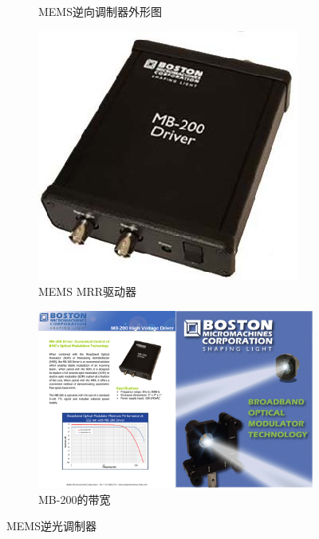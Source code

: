 \begin{figure}[t]
\begin{subfigure}[c]{0.3\textwidth}
		\caption{MEMS逆向调制器外形图}
		\label{fig:boston-MEMS-MRR-outer.jpg}
	\end{subfigure}
	\begin{subfigure}[c]{0.3\textwidth}
		\includegraphics[width=\textwidth]{./Img/boston-MEMS-MRR-driver.jpg}
		\caption{MEMS MRR驱动器}
		\label{fig:boston-MEMS-MRR-driver.jpg}
	\end{subfigure}
	\begin{subfigure}[c]{0.7\textwidth}
	\includegraphics[width=\textwidth]{./Img/MB-200-frequency.pdf}
	\caption{MB-200的带宽}
	\label{fig:MB-200-frequency.pdf}
	\end{subfigure}
	\caption{MEMS逆光调制器}
	\label{fig:MEMS-MRR-FIGURE}
\end{figure}

